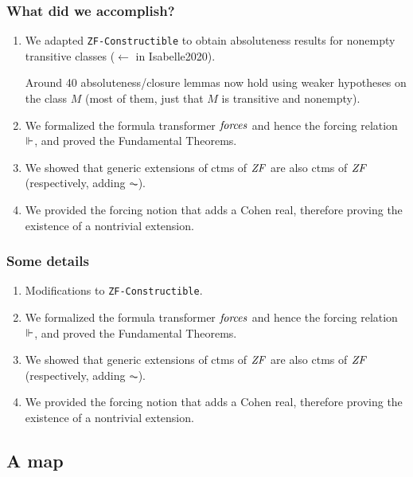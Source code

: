 \documentclass[english]{beamer}
\begin{document}
\begin{frame}
  \frametitle{What did we accomplish?}
  \begin{shadowblock}{}
    \begin{enumerate}
    \item<+-> We adapted \texttt{ZF-Constructible} to obtain
      absoluteness results for nonempty transitive classes ($\leftarrow$
      \alert{in Isabelle2020}).
      \pause
      
      Around 40 absoluteness/closure lemmas now hold using weaker
      hypotheses on the class $M$ (most of them, just that $M$ is
      transitive and nonempty). 
      \pause
    \item<+-> We formalized the formula transformer $\mathit{forces}$ and
      hence the forcing relation $\Vdash$, and proved the Fundamental
      Theorems.
    \item<+-> We showed that generic extensions of ctms of $\mathit{ZF}$ are also
      ctms of $\mathit{ZF}$ (respectively, adding $\AC$).
    \item<+-> We provided the forcing notion that adds a Cohen real,
      therefore proving the existence of a nontrivial extension.
    \end{enumerate}
  \end{shadowblock}
\end{frame}

\begin{frame}
  \frametitle{Some details}
  \begin{enumerate}
  \item<+-> Modifications to \texttt{ZF-Constructible}.


  \item<+-> We formalized the formula transformer $\mathit{forces}$ and
    hence the forcing relation $\Vdash$, and proved the Fundamental
    Theorems.
  \item<+-> We showed that generic extensions of ctms of $\mathit{ZF}$ are also
    ctms of $\mathit{ZF}$ (respectively, adding $\AC$).
  \item<+-> We provided the forcing notion that adds a Cohen real,
    therefore proving the existence of a nontrivial extension.
  \end{enumerate}
\end{frame}

\subsection{A map}
\end{document}
